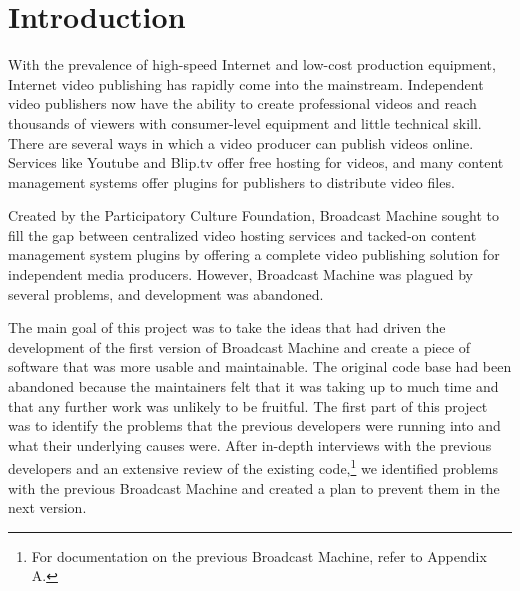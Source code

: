 \documentclass[a4paper,12pt]{report}
\begin{document}
\tableofcontents

\chapter{Introduction}
With the prevalence of high-speed Internet and low-cost production equipment, Internet video publishing has rapidly come into the 
mainstream. Independent video publishers now have the ability to create professional videos and reach thousands of viewers with consumer-level equipment and little technical skill. There are several ways in which a video producer can publish videos online. Services like Youtube and Blip.tv offer free hosting for videos, and many content management systems offer plugins for publishers to distribute video files.

Created by the Participatory Culture Foundation, Broadcast Machine sought to fill the gap between centralized video hosting services and tacked-on content management system plugins by offering a complete video publishing solution for independent media producers. However, Broadcast Machine was plagued by several problems, and development was abandoned.

The main goal of this project was to take the ideas that had driven the development of the first version of Broadcast Machine and create a piece of software that was more usable and maintainable.
The original code base had been abandoned because the maintainers felt that it was taking up to much time and that any further work was unlikely to be fruitful.
The first part of this project was to identify the problems that the previous developers were running into and what their underlying causes were.
After in-depth interviews with the previous developers and an extensive review of the existing code,\footnote{For documentation on the previous Broadcast Machine, refer to Appendix A.} we identified problems with the previous Broadcast Machine and created a plan to prevent them in the next version.
\end{document}
